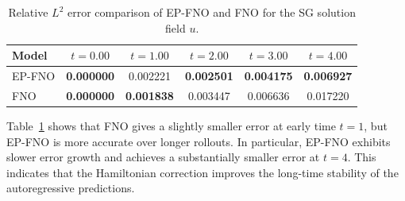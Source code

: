 \documentclass[11pt,a4paper]{article}
\theoremstyle{definition}
\theoremstyle{remark}
\numberwithin{equation}{section}
\numberwithin{figure}{section}
\numberwithin{table}{section}
\begin{document}
\begin{table}[H] 
\centering
\caption{Relative \(L^2\) error comparison of EP-FNO and FNO for the SG solution field \(u\).}
\label{tab:epfno_fno_sine_gordon_2d_u_l2_error_comparison}
\renewcommand{\arraystretch}{1.15}
\begin{tabular}{lccccc}
\toprule[1.5pt]
\textbf{Model} 
& \textbf{\(t=0.00\)} & \textbf{\(t=1.00\)} & \textbf{\(t=2.00\)} 
& \textbf{\(t=3.00\)} & \textbf{\(t=4.00\)} \\
\midrule[1.2pt]
EP-FNO 
& \textbf{0.000000} & 0.002221 & \textbf{0.002501} 
& \textbf{0.004175} & \textbf{0.006927} \\
FNO    
& \textbf{0.000000} & \textbf{0.001838} & 0.003447 
& 0.006636 & 0.017220 \\
\bottomrule[1.5pt]
\end{tabular}
\end{table}


Table~\ref{tab:epfno_fno_sine_gordon_2d_u_l2_error_comparison} shows that FNO gives a slightly smaller error at early time \(t=1\), but EP-FNO is more accurate over longer rollouts. In particular, EP-FNO exhibits slower error growth and achieves a substantially smaller error at \(t=4\). This indicates that the Hamiltonian correction improves the long-time stability of the autoregressive predictions.
\end{document}
